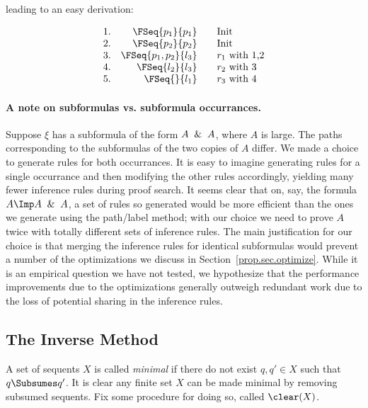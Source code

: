 \noindent
leading to an easy derivation:

\[
\begin{array}{lr@{\hspace{2em}}l}
  1. & \FSeq{p_1}{p_1}& \mbox{Init} \\
  2. & \FSeq{p_2}{p_2}& \mbox{Init}\\
  3. & \FSeq{p_1,p_2}{l_3}& \mbox{$r_1$ with 1,2}\\
  4. & \FSeq{l_2}{l_3}&\mbox{$r_2$ with 3}\\
  5. & \FSeq{}{l_1}&\mbox{$r_3$ with 4}\\
\end{array}
\]

\paragraph{A note on subformulas vs. subformula occurrances.}

Suppose $\xi$ has a subformula of the form $A\And A$, where $A$ is large.
The paths corresponding to the subformulas of the two copies of $A$
differ.  We
made a choice to generate rules for both occurrances.  It is easy to imagine
generating rules for a single occurrance and then modifying the other rules
accordingly, yielding many fewer inference rules during proof search.  It seems
clear that on, say, the formula $A\Imp A\And A$, a set of rules so generated
would be more efficient than the ones we generate using the path/label method;
with our choice we need to prove $A$ twice with totally different sets of
inference rules.  The main justification for our choice is that merging the
inference rules for identical subformulas would prevent a number of the
optimizations we discuss in Section~\ref{prop.sec.optimize}.  While it is an
empirical question we have not tested, we hypothesize that the performance
improvements due to the optimizations generally outweigh redundant
work due to the loss of potential sharing in the inference rules.

\subsection{The Inverse Method}
\label{prop.sec.inverse}

\begin{definition} A set of sequents $X$ is called \emph{minimal} if there do
not exist $q,q'\in X$ such that $q\Subsumes q'$.  It is clear any finite set $X$
can be made minimal by removing subsumed sequents. Fix some procedure for doing
so, called $\clear(X)$.
\end{definition}

